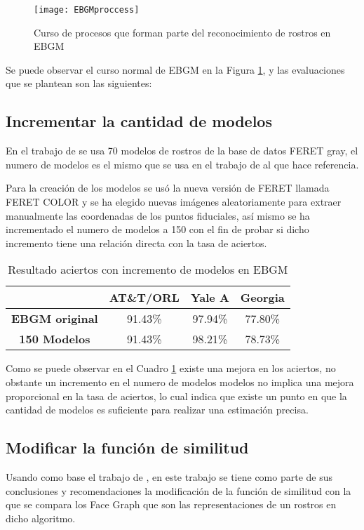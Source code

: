 \begin{figure}[h]
\center
	\texttt{[image: EBGMproccess]}
    \caption{Curso de procesos que forman parte del reconocimiento de rostros en \ac{EBGM}}
    \label{im:parametos}
\end{figure}

Se puede observar el curso normal de \ac{EBGM} en la Figura \ref{im:parametos}, y las evaluaciones que se plantean son las siguientes:

\subsection{Incrementar la cantidad de modelos}
En el trabajo de \cite{bolme2003elastic} se usa 70 modelos de rostros de la base de datos FERET gray, el numero de modelos es el mismo que se usa en el trabajo de \cite{wiskott1997face} al que hace referencia.

Para la creación de los modelos se usó la nueva versión de FERET llamada FERET COLOR y se ha elegido nuevas imágenes aleatoriamente para extraer manualmente las coordenadas de los puntos fiduciales, así mismo se ha incrementado el numero de modelos a 150 con el fin de probar si dicho incremento tiene una relación directa con la tasa de aciertos.

\begin{table}[h]
\centering
\caption{Resultado aciertos con incremento de modelos en \ac{EBGM}}
\label{ta:ModelInc}
\begin{tabular}{|c|c|c|c|}
\hline 
                     & \textbf{AT\&T/ORL} & \textbf{Yale A} & \textbf{Georgia} \\ \hline
\textbf{\ac{EBGM} original}  & 91.43\%            & 97.94\%         & 77.80\%          \\ \hline
\textbf{150 Modelos}         & 91.43\%            & 98.21\%         & 78.73\%          \\ \hline
\end{tabular}
\end{table}

Como se puede observar en el Cuadro \ref{ta:ModelInc} existe una mejora en los aciertos, no obstante un incremento en el numero de modelos modelos no implica una mejora proporcional en la tasa de aciertos, lo cual indica que existe un punto en que la cantidad de modelos es suficiente para realizar una estimación precisa.

\subsection{Modificar la función de similitud} 
Usando como base el trabajo de \cite{bolme2003elastic}, en este trabajo se tiene como parte de sus conclusiones y recomendaciones la modificación de la función de similitud con la que se compara los Face Graph que son las representaciones de un rostros en dicho algoritmo.

